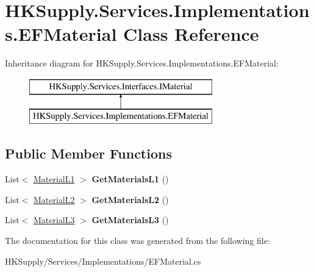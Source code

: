 \hypertarget{class_h_k_supply_1_1_services_1_1_implementations_1_1_e_f_material}{}\section{H\+K\+Supply.\+Services.\+Implementations.\+E\+F\+Material Class Reference}
\label{class_h_k_supply_1_1_services_1_1_implementations_1_1_e_f_material}
Inheritance diagram for H\+K\+Supply.\+Services.\+Implementations.\+E\+F\+Material\+:\begin{figure}[H]
\begin{center}
\leavevmode
\includegraphics[height=2.000000cm]{class_h_k_supply_1_1_services_1_1_implementations_1_1_e_f_material}
\end{center}
\end{figure}
\subsection*{Public Member Functions}
\begin{DoxyCompactItemize}
\item 
\mbox{\label{class_h_k_supply_1_1_services_1_1_implementations_1_1_e_f_material_a88b9fb1aabda2d23ce6df8df14abb3c1}} 
List$<$ \mbox{\hyperlink{class_h_k_supply_1_1_models_1_1_material_l1}{Material\+L1}} $>$ {\bfseries Get\+Materials\+L1} ()
\item 
\mbox{\label{class_h_k_supply_1_1_services_1_1_implementations_1_1_e_f_material_ad49c8541d6e73fd90d9d13da0ea67ec1}} 
List$<$ \mbox{\hyperlink{class_h_k_supply_1_1_models_1_1_material_l2}{Material\+L2}} $>$ {\bfseries Get\+Materials\+L2} ()
\item 
\mbox{\label{class_h_k_supply_1_1_services_1_1_implementations_1_1_e_f_material_a2d717ac090bb69d23091e27829875a17}} 
List$<$ \mbox{\hyperlink{class_h_k_supply_1_1_models_1_1_material_l3}{Material\+L3}} $>$ {\bfseries Get\+Materials\+L3} ()
\end{DoxyCompactItemize}


The documentation for this class was generated from the following file\+:\begin{DoxyCompactItemize}
\item 
H\+K\+Supply/\+Services/\+Implementations/E\+F\+Material.\+cs\end{DoxyCompactItemize}
